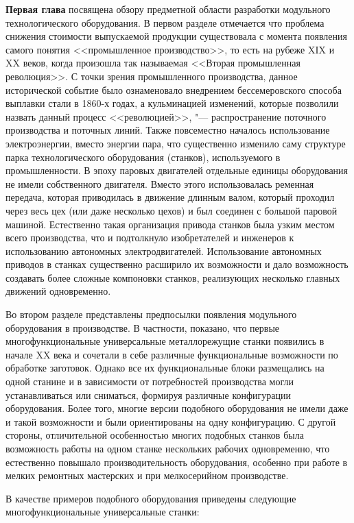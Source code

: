 \textbf{Первая глава} посвящена обзору предметной области разработки модульного технологического оборудования. 
В первом разделе отмечается что проблема снижения стоимости выпускаемой продукции существовала с момента появления самого понятия <<промышленное производство>>, то есть на рубеже XIX и XX веков, когда произошла так называемая <<Вторая промышленная революция>>. С точки зрения промышленного производства, данное исторической событие было ознаменовало внедрением бессемеровского способа выплавки стали в 1860-х годах, а кульминацией изменений, которые позволили назвать данный процесс <<революцией>>, "--- распространение поточного производства и поточных линий. Также повсеместно началось использование электроэнергии, вместо энергии пара, что существенно изменило саму структуре парка технологического оборудования (станков), используемого в промышленности. В эпоху паровых двигателей отдельные единицы оборудования не имели собственного двигателя. Вместо этого использовалась ременная передача, которая приводилась в движение длинным валом, который проходил через весь цех (или даже несколько цехов) и был соединен с большой паровой машиной. Естественно такая организация привода станков была узким местом всего производства, что и подтолкнуло изобретателей и инженеров к использованию автономных электродвигателей. Использование автономных приводов в станках существенно расширило их возможности и дало возможность создавать более сложные компоновки станков, реализующих несколько главных движений одновременно.

Во втором разделе представлены предпосылки появления модульного оборудования в производстве. В частности, показано, что первые многофункциональные универсальные металлорежущие станки появились в начале XX века и сочетали в себе различные функциональные возможности по обработке заготовок. Однако все их функциональные блоки размещались на одной станине и в зависимости от потребностей производства могли устанавливаться или сниматься, формируя различные конфигурации оборудования. Более того, многие версии подобного оборудования не имели даже и такой возможности и были ориентированы на одну конфигурацию. С другой стороны, отличительной особенностью многих подобных станков была возможность работы на одном станке нескольких рабочих одновременно, что естественно повышало производительность оборудования, особенно при работе в мелких ремонтных мастерских и при мелкосерийном производстве. 

В качестве примеров подобного оборудования приведены следующие многофункциональные универсальные станки:

